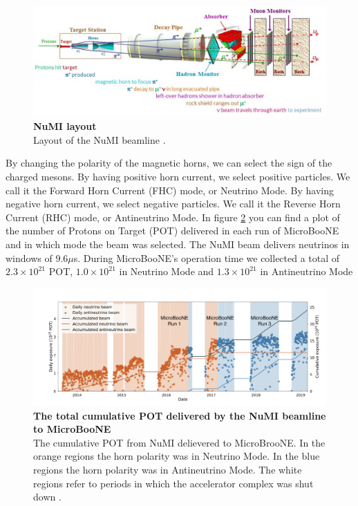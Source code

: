\begin{figure}[h!]
    \centering
    \includegraphics[width=140mm]{Figures/numi.jpg}
    \caption[NuMI layout]{{\textbf{NuMI layout}} \\Layout of the NuMI beamline \cite{numi}.}
    \label{fig:numi}
\end{figure}

By changing the polarity of the magnetic horns, we can select the sign of the charged mesons. By having positive horn current, we select positive particles. We call it the Forward Horn Current (FHC) mode, or Neutrino Mode. By having negative horn current, we select negative particles. We call it the Reverse Horn Current (RHC) mode, or Antineutrino Mode. In figure \ref{beam_mode_uboone} you can find a plot of the number of Protons on Target (POT) delivered in each run of MicroBooNE and in which mode the beam was selected. The NuMI beam delivers neutrinos in windows of $9.6 \mu$s. During MicroBooNE's operation time we collected a total of $2.3\times 10^{21}$ POT, $1.0\times10^{21}$ in Neutrino Mode and $1.3\times10^{21}$ in Antineutrino Mode

\begin{figure}[h!]
    \centering
    \includegraphics[width=150mm]{Figures/beam_mode_uboone.png}
    \caption[The total cumulative POT delivered by the NuMI beamline to MicroBooNE]{{\textbf{The total cumulative POT delivered by the NuMI beamline to MicroBooNE}}\\The cumulative POT from NuMI delievered to MicroBrooNE. In the orange regions the horn polarity was in Neutrino Mode. In the blue regions the horn polarity was in Antineutrino Mode. The white regions refer to periods in which the accelerator complex was shut down \cite{krish_phd}.}
    \label{beam_mode_uboone}
\end{figure}


